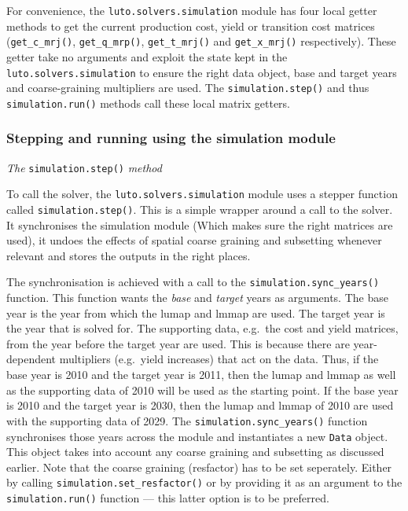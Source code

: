 \documentclass{draft}
\begin{document}
For convenience, the \texttt{luto.solvers.simulation} module has four local getter methods to get the current production cost, yield or transition cost matrices (\texttt{get_c_mrj()}, \texttt{get_q_mrp()}, \texttt{get_t_mrj()} and \texttt{get_x_mrj()} respectively). These getter take no arguments and exploit the state kept in the \texttt{luto.solvers.simulation} to ensure the right data object, base and target years and coarse-graining multipliers are used. The \texttt{simulation.step()} and thus \texttt{simulation.run()} methods call these local matrix getters.

\subsubsection{Stepping and running using the simulation module}

\emph{The} \texttt{simulation.step()} \emph{method}

To call the solver, the \texttt{luto.solvers.simulation} module uses a stepper function called \texttt{simulation.step()}. This is a simple wrapper around a call to the solver. It synchronises the simulation module (Which makes sure the right matrices are used), it undoes the effects of spatial coarse graining and subsetting whenever relevant and stores the outputs in the right places.

The synchronisation is achieved with a call to the \texttt{simulation.sync_years()} function. This function wants the \emph{base} and \emph{target} years as arguments. The base year is the year from which the lumap and lmmap are used. The target year is the year that is solved for. The supporting data, e.g.\ the cost and yield matrices, from the year before the target year are used. This is because there are year-dependent multipliers (e.g.\ yield increases) that act on the data. Thus, if the base year is 2010 and the target year is 2011, then the lumap and lmmap as well as the supporting data of 2010 will be used as the starting point. If the base year is 2010 and the target year is 2030, then the lumap and lmmap of 2010 are used with the supporting data of 2029. The \texttt{simulation.sync_years()} function synchronises those years across the module and instantiates a new \texttt{Data} object. This object takes into account any coarse graining and subsetting as discussed earlier. Note that the coarse graining (resfactor) has to be set seperately. Either by calling \texttt{simulation.set_resfactor()} or by providing it as an argument to the \texttt{simulation.run()} function --- this latter option is to be preferred.
\end{document}
